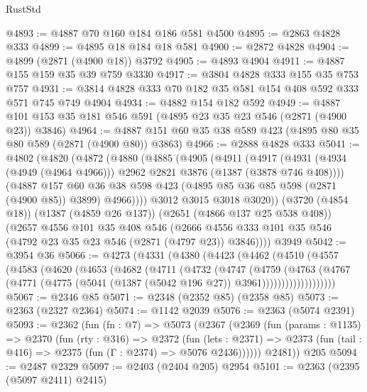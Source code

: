 \begin{lexlean}{RustStd}
\begin{coremodule}
@4893 := @4887 @70 @160 @184 @186 @581 @4500
@4895 := @2863 @4828 @333
@4899 := @4895 @18 @184 @18 @581
@4900 := @2872 @4828
@4904 := @4899 (@2871 (@4900 @18)) @3792
@4905 := @4893 @4904
@4911 := @4887 @155 @159 @35 @39 @759 @3330
@4917 := @3804 @4828 @333 @155 @35 @753 @757
@4931 := @3814 @4828 @333 @70 @182 @35 @581 @154 @408 @592 @333 @571 @745 @749 @4904
@4934 := @4882 @154 @182 @592
@4949 := @4887 @101 @153 @35 @181 @546 @591 (@4895 @23 @35 @23 @546 (@2871 (@4900 @23)) @3846)
@4964 := @4887 @151 @60 @35 @38 @589 @423 (@4895 @80 @35 @80 @589 (@2871 (@4900 @80)) @3863)
@4966 := @2888 @4828 @333
@5041 := @4802
    (@4820
      (@4872
        (@4880
          (@4885
            (@4905
              (@4911
                (@4917
                  (@4931 (@4934 (@4949 (@4964 @4966))) @2962 @2821 @3876 (@1387 (@3878 @746 @408))))
                (@4887
                  @157
                  @60
                  @36
                  @38
                  @598
                  @423
                  (@4895 @85 @36 @85 @598 (@2871 (@4900 @85)) @3899)
                  @4966))))
          @3012
          @3015
          @3018
          @3020))
      (@3720 (@4854 @18))
      (@1387 (@4859 @26 @137))
      (@2651 (@4866 @137 @25 @538 @408))
      (@2657
        @4556
        @101
        @35
        @408
        @546
        (@2666 @4556 @333 @101 @35 @546 (@4792 @23 @35 @23 @546 (@2871 (@4797 @23)) @3846))))
    @3949
@5042 := @3954 @36
@5066 := @4273
    (@4331
      (@4380
        (@4423
          (@4462
            (@4510
              (@4557
                (@4583
                  (@4620
                    (@4653
                      (@4682
                        (@4711
                          (@4732
                            (@4747
                              (@4759
                                (@4763
                                  (@4767
                                    (@4771
                                      (@4775
                                        (@5041 (@1387 (@5042 @196 @27)) @3961)))))))))))))))))))
@5067 := @2346 @85
@5071 := @2348 (@2352 @85) (@2358 @85)
@5073 := @2363 (@2327 @2364)
@5074 := @1142 @2039
@5076 := @2363 (@5074 @2391)
@5093 := @2362
    (fun (fn : @7) =>
    @5073
      (@2367
        (@2369
          (fun (params : @1135) =>
          @2370
            (fun (rty : @316) =>
            @2372
              (fun (lets : @2371) =>
              @2373 (fun (tail : @416) => @2375 (fun (Γ : @2374) => @5076 @2436))))))
        @2481))
    @205
@5094 := @2487 @2329
@5097 := @2403 (@2404 @205) @2954
@5101 := @2363 (@2395 (@5097 @2411) @2415)

\end{coremodule}
\end{lexlean}
